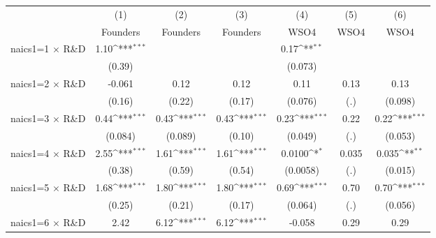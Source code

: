 {
\def\sym#1{\ifmmode^{#1}\else\(^{#1}\)\fi}
\begin{tabular}{l*{6}{c}}
\toprule
                    &\multicolumn{1}{c}{(1)}&\multicolumn{1}{c}{(2)}&\multicolumn{1}{c}{(3)}&\multicolumn{1}{c}{(4)}&\multicolumn{1}{c}{(5)}&\multicolumn{1}{c}{(6)}\\
                    &\multicolumn{1}{c}{Founders}&\multicolumn{1}{c}{Founders}&\multicolumn{1}{c}{Founders}&\multicolumn{1}{c}{WSO4}&\multicolumn{1}{c}{WSO4}&\multicolumn{1}{c}{WSO4}\\
\midrule
naics1=1 $\times$ R\&D&        1.10\sym{***}&                     &                     &        0.17\sym{**} &                     &                     \\
                    &      (0.39)         &                     &                     &     (0.073)         &                     &                     \\
\addlinespace
naics1=2 $\times$ R\&D&      -0.061         &        0.12         &        0.12         &        0.11         &        0.13         &        0.13         \\
                    &      (0.16)         &      (0.22)         &      (0.17)         &     (0.076)         &         (.)         &     (0.098)         \\
\addlinespace
naics1=3 $\times$ R\&D&        0.44\sym{***}&        0.43\sym{***}&        0.43\sym{***}&        0.23\sym{***}&        0.22         &        0.22\sym{***}\\
                    &     (0.084)         &     (0.089)         &      (0.10)         &     (0.049)         &         (.)         &     (0.053)         \\
\addlinespace
naics1=4 $\times$ R\&D&        2.55\sym{***}&        1.61\sym{***}&        1.61\sym{***}&      0.0100\sym{*}  &       0.035         &       0.035\sym{**} \\
                    &      (0.38)         &      (0.59)         &      (0.54)         &    (0.0058)         &         (.)         &     (0.015)         \\
\addlinespace
naics1=5 $\times$ R\&D&        1.68\sym{***}&        1.80\sym{***}&        1.80\sym{***}&        0.69\sym{***}&        0.70         &        0.70\sym{***}\\
                    &      (0.25)         &      (0.21)         &      (0.17)         &     (0.064)         &         (.)         &     (0.056)         \\
\addlinespace
naics1=6 $\times$ R\&D&        2.42         &        6.12\sym{***}&        6.12\sym{***}&      -0.058         &        0.29         &        0.29         \\

\end{tabular}}
